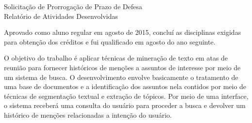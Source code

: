 	\thispagestyle{empty}
	\singlespacing

	\noindent

	\vi
	\vi
	\vi

	\begin{center}
		\Large Solicitação de Prorrogação de Prazo de Defesa\\
		\vi
		\large Relatório de Atividades Desenvolvidas

	\end{center}
	\vi
	
	

\newcommand{\urlatas}{http://www.ppgccs.net/?page\_id=1150}

\newcommand{\urleniac}{http://www.bracis2017.ufu.br/eniac-encontro-nacional-de-inteligencia-artificial-e-computacional\#tab-0-0}

Aprovado como aluno regular em agosto de 2015, concluí as disciplinas exigidas para obtenção dos créditos e fui qualificado em agosto do ano seguinte. 

O objetivo do trabalho é aplicar técnicas de mineração de texto em atas de reunião para fornecer históricos de menções a assuntos de interesse por meio de um sistema de busca. O desenvolvimento envolve basicamente 
o tratamento de uma base de documentos e a identificação dos assuntos nela contidos por meio de técnicas de segmentação textual e extração de tópicos. Por meio de uma interface, o sistema receberá uma consulta do usuário para proceder a busca e devolver um histórico de menções relacionadas a intenção do usuário.



